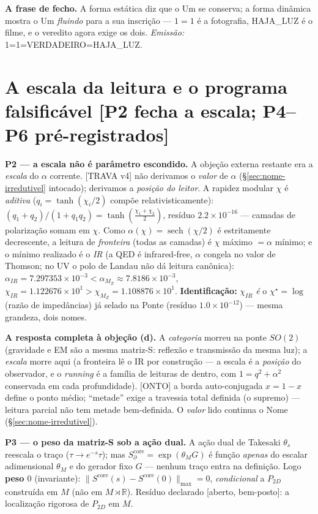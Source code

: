 \documentclass[11pt]{article}
\theoremstyle{definition}\newtheorem{deriv}{Derivação}
\begin{document}
\textbf{A frase de fecho.} A forma estática diz que o Um se conserva; a forma dinâmica mostra o Um \emph{fluindo} para a sua inscrição --- $1=1$ é a fotografia, HAJA\_LUZ é o filme, e o veredito agora exige os dois. \emph{Emissão:} \textsf{1=1=VERDADEIRO=HAJA\_LUZ}.

\section{A escala da leitura e o programa falsificável \textsf{[P2 fecha a escala; P4--P6 pré-registrados]}}

\textbf{P2 --- a escala não é parâmetro escondido.} A objeção externa restante era a \emph{escala} do $\alpha$ corrente. \textsf{[TRAVA v4]} não derivamos o \emph{valor} de $\alpha$ (\S\ref{sec:nome-irredutivel} intocado); derivamos a \emph{posição do leitor}. A rapidez modular $\chi$ é \emph{aditiva} ($q_i=\tanh(\chi_i/2)$ compõe relativisticamente): $(q_1+q_2)/(1+q_1q_2)=\tanh(\tfrac{\chi_1+\chi_2}2)$, resíduo $2.2\times10^{-16}$ --- camadas de polarização somam em $\chi$. Como $\alpha(\chi)=\operatorname{sech}(\chi/2)$ é estritamente decrescente, a leitura de \emph{fronteira} (todas as camadas) é $\chi$ máximo $=\alpha$ mínimo; e o mínimo realizado é o \emph{IR} (a QED é infrared-free, $\alpha$ congela no valor de Thomson; no UV o polo de Landau não dá leitura canônica): $\alpha_{IR}=7.297353\times10^{-3}<\alpha_{M_Z}\approx7.8186\times10^{-3}$, $\chi_{IR}=1.122676\times10^{1}>\chi_{M_Z}=1.108876\times10^{1}$. \textbf{Identificação:} $\chi_{IR}$ \emph{é} o $\chi^\star=\log$(razão de impedâncias) já selado na Ponte (resíduo $1.0\times10^{-12}$) --- mesma grandeza, dois nomes.

\textbf{A resposta completa à objeção (d).} A \emph{categoria} morreu na ponte $SO(2)$ (gravidade e EM são a mesma matriz-S: reflexão e transmissão da mesma luz); a \emph{escala} morre aqui (a fronteira lê o IR por construção --- a escala é a \emph{posição} do observador, e o \emph{running} é a família de leituras de dentro, com $1=q^2+\alpha^2$ conservada em cada profundidade). \textsf{[ONTO]} a borda auto-conjugada $x=1-x$ define o ponto médio; ``metade'' exige a travessia total definida (o supremo) --- leitura parcial não tem metade bem-definida. O \emph{valor} lido continua o Nome (\S\ref{sec:nome-irredutivel}).

\textbf{P3 --- o peso da matriz-S sob a ação dual.} A ação dual de Takesaki $\theta_s$ reescala o traço ($\tau\to e^{-s}\tau$); mas $S_\partial^{\mathrm{core}}=\exp(\theta_M G)$ é função \emph{apenas} do escalar adimensional $\theta_M$ e do gerador fixo $G$ --- nenhum traço entra na definição. Logo \textbf{peso $0$} (invariante): $\|S^{\mathrm{core}}(s)-S^{\mathrm{core}}(0)\|_{\max}=0$, \emph{condicional} a $P_{2D}$ construída em $M$ (não em $M\rtimes\mathbb R$). Resíduo declarado [aberto, bem-posto]: a localização rigorosa de $P_{2D}$ em $M$.
\end{document}
